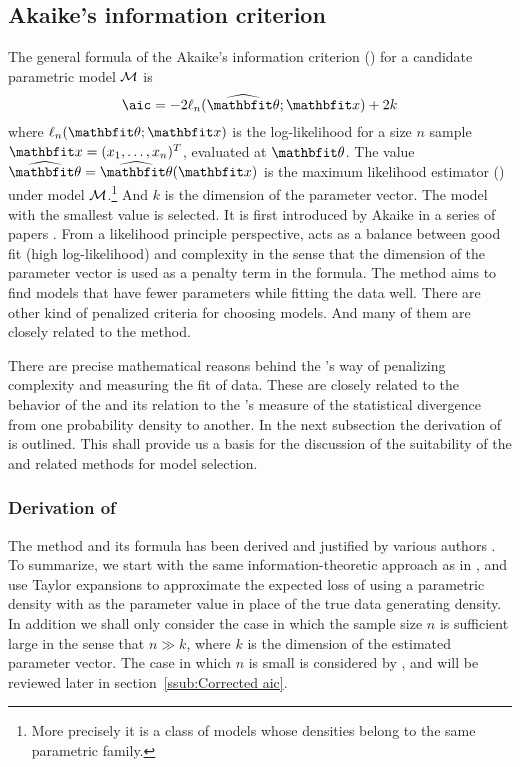 \documentclass[10pt, hyper, bib, fontset=Lucida,
linespread=1.3, typearearatio=0.75]{marticle}
\begin{document}
\subsection{Akaike's information criterion}
\label{sub:Akaike's information criterion}

The general formula of the Akaike's information criterion (\aic) for a
candidate parametric model $\mathcal{M}$ is
\begin{equation}
  \text{\aic} = -2\ell_n(\hbth;\bfx) + 2k
\end{equation}
where $\ell_n(\bth;\bfx)$ is the log-likelihood for a size $n$ sample
$\bfx=(x_1,\dots,x_n)^T$, evaluated at $\bth$. The value $\hbth = \hbth(\bfx)$
is the maximum likelihood estimator (\mle) under model $\mathcal{M}$.\footnote{More
  precisely it is a class of models whose densities belong to the same
  parametric family.} And $k$ is the dimension of the parameter vector. The
model with the smallest \aic value is selected. It is first introduced by
Akaike in a series of papers \parencite{Akaike:1973uc, Akaike:1974ih,
  Akaike:1977ul}. From a likelihood principle perspective, \aic acts as a
balance between good fit (high log-likelihood) and complexity in the sense
that the dimension of the parameter vector is used as a penalty term in the
formula.  The \aic method aims to find models that have fewer parameters while
fitting the data well. There are other kind of penalized criteria for choosing
models.  And many of them are closely related to the \aic method.


There are precise mathematical reasons behind the \aic's way of penalizing
complexity and measuring the fit of data. These are closely related to the
behavior of the \mle and its relation to the \textcite{Kullback:1951va}'s
measure of the statistical divergence from one probability density to another.
In the next subsection the derivation of \aic is outlined. This shall provide
us a basis for the discussion of the suitability of the \aic and related
methods for model selection.

\subsubsection{Derivation of \protect\aic}
\label{ssub:Derivation of aic}

The \aic method and its formula has been derived and justified by various
authors \parencite[e.g.][]{Stone:1982ck, Sawa:1978tn, Chow:1981te,
  Bozdogan:1987wy, Akaike:1973uc}. To summarize, we start with the same
information-theoretic approach as in \textcite{Akaike:1973uc}, and use Taylor
expansions to approximate the expected loss of using a parametric density with
\mle as the parameter value in place of the true data generating density. In
addition we shall only consider the case in which the sample size $n$ is
sufficient large in the sense that $n\gg k$, where $k$ is the dimension of the
estimated parameter vector. The case in which $n$ is small is considered by
\textcite{Hurvich:1989ev}, and will be reviewed later in
section~\ref{ssub:Corrected aic}.
\end{document}
